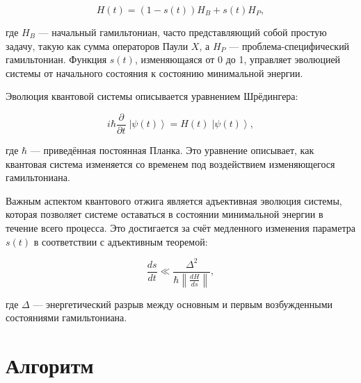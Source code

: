 \documentclass[a4paper]{report}
\newcommand{\ket}[1] {\!\!\;\ensuremath{\left|#1\right\rangle}}
\begin{document}
\begin{equation}
H(t) = (1 - s(t)) H_B + s(t) H_P,
\end{equation}

где $H_B$ — начальный гамильтониан, часто представляющий собой простую задачу, такую как сумма операторов Паули $X$, а $H_P$ — проблема-специфический гамильтониан. Функция $s(t)$, изменяющаяся от 0 до 1, управляет эволюцией системы от начального состояния к состоянию минимальной энергии.

Эволюция квантовой системы описывается уравнением Шрёдингера:

\begin{equation}
i \hbar \frac{\partial}{\partial t} \ket{\psi(t)} = H(t) \ket{\psi(t)},
\end{equation}

где $\hbar$ — приведённая постоянная Планка. Это уравнение описывает, как квантовая система изменяется со временем под воздействием изменяющегося гамильтониана.

Важным аспектом квантового отжига является адъективная эволюция системы, которая позволяет системе оставаться в состоянии минимальной энергии в течение всего процесса. Это достигается за счёт медленного изменения параметра $s(t)$ в соответствии с адъективным теоремой:

\begin{equation}
\frac{ds}{dt} \ll \frac{\Delta^2}{\hbar \left\lVert \frac{dH}{ds} \right\rVert},
\end{equation}

где $\Delta$ — энергетический разрыв между основным и первым возбужденными состояниями гамильтониана.


\section{Алгоритм}
\end{document}
